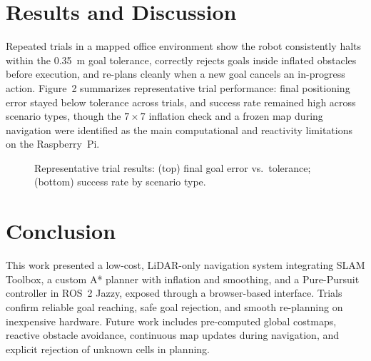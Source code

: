 \documentclass[10pt,twocolumn]{article}
\begin{document}
\section{Results and Discussion}
Repeated trials in a mapped office environment show the robot consistently halts within the 0.35~m goal tolerance, correctly rejects goals inside inflated obstacles before execution, and re-plans cleanly when a new goal cancels an in-progress action. Figure~2 summarizes representative trial performance: final positioning error stayed below tolerance across trials, and success rate remained high across scenario types, though the $7{\times}7$ inflation check and a frozen map during navigation were identified as the main computational and reactivity limitations on the Raspberry~Pi.

\begin{figure}[h]
\centering
{}

\vspace{2mm}
\caption{Representative trial results: (top) final goal error vs.\ tolerance; (bottom) success rate by scenario type.}
\label{fig:results}
\end{figure}

\section{Conclusion}
This work presented a low-cost, LiDAR-only navigation system integrating SLAM Toolbox, a custom A* planner with inflation and smoothing, and a Pure-Pursuit controller in ROS~2 Jazzy, exposed through a browser-based interface. Trials confirm reliable goal reaching, safe goal rejection, and smooth re-planning on inexpensive hardware. Future work includes pre-computed global costmaps, reactive obstacle avoidance, continuous map updates during navigation, and explicit rejection of unknown cells in planning.
\end{document}
